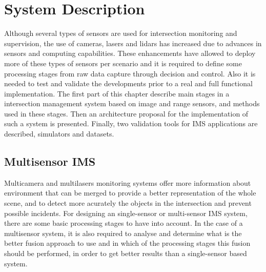 
\chapter {System Description}

Although several types of sensors are used for intersection monitoring and supervision, the use of cameras, lasers and lidars has increased due to advances in sensors and computing capabilities. These enhancements have allowed to deploy more of these types of sensors per scenario and it is required to define some processing stages from raw data capture through decision and control. Also it is needed to test and validate the developments prior to a real and full functional implementation. The first part of this chapter describe main stages in a intersection management system based on image and range sensors, and methods used in these stages. Then an architecture proposal for the implementation of such a system is presented. Finally, two validation tools for IMS applications are described, simulators and datasets.

\section{Multisensor IMS}

Multicamera and multilasers monitoring systems offer more information about environment that can be merged to provide a better representation of the whole scene, and to detect more acurately the objects in the intersection and prevent possible incidents. For designing an single-sensor or multi-sensor IMS system, there are some basic processing stages to have into account. In the case of a multisensor system, it is also required to analyse and determine what is the better fusion approach to use and in which of the processing stages this fusion should be performed, in order to get better results than a single-sensor based system.

